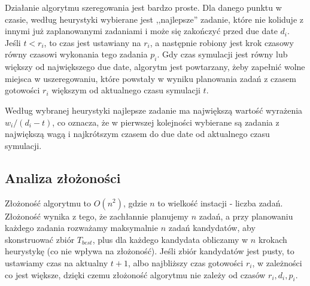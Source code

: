 \documentclass[11pt]{article}
\begin{document}
Działanie algorytmu szeregowania jest bardzo proste. Dla danego punktu w czasie, według heurystyki wybierane jest ,,najlepsze'' zadanie, które nie koliduje z innymi już zaplanowanymi zadaniami i może się zakończyć przed due date $d_i$. Jeśli $t < r_i$, to czas jest ustawiany na $r_i$, a następnie robiony jest krok czasowy równy czasowi wykonania tego zadania $p_i$. Gdy czas symulacji jest równy lub większy od największego due date, algorytm jest powtarzany, żeby zapełnić wolne miejsca w uszeregowaniu, które powstały w wyniku planowania zadań z czasem gotowości $r_i$ większym od aktualnego czasu symulacji $t$.

Według wybranej heurystyki najlepsze zadanie ma największą wartość wyrażenia $w_i/(d_i - t)$, co oznacza, że w pierwszej kolejności wybierane są zadania z największą wagą i najkrótszym czasem do due date od aktualnego czasu symulacji.

\subsection{Analiza złożoności}

Złożoność algorytmu to $O(n^2)$, gdzie $n$ to wielkość instacji - liczba zadań. Złożoność wynika z tego, że zachłannie planujemy $n$ zadań, a przy planowaniu każdego zadania rozważamy maksymalnie $n$ zadań kandydatów, aby skonstruować zbiór $T_{best}$, plus dla każdego kandydata obliczamy w $n$ krokach heurystykę (co nie wpływa na złożoność). Jeśli zbiór kandydatów jest pusty, to ustawiamy czas na aktualny $t + 1$, albo najbliższy czas gotowości $r_i$, w zależności co jest większe, dzięki czemu złożoność algorytmu nie zależy od czasów $r_i, d_i, p_i$.
\end{document}
